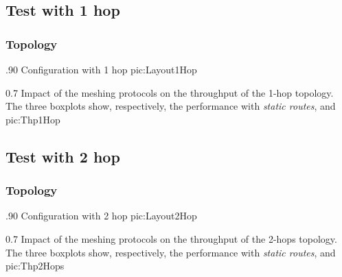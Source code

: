 \subsection{Test with 1 hop}

    \subsubsection{Topology}

                {.90\columnwidth}
                {Configuration with 1 hop}
                {pic:Layout1Hop}

                {0.7 \columnwidth}
                {Impact of the meshing protocols on the throughput of the
                 1-hop topology. The three boxplots show, respectively, the
                 performance with \emph{static routes}, \emph{\batman} and
                 \emph{\olsr}}
                {pic:Thp1Hop}

\subsection{Test with 2 hop}

    \subsubsection{Topology}

                {.90\columnwidth}
                {Configuration with 2 hop}
                {pic:Layout2Hop}

                {0.7 \columnwidth}
                {Impact of the meshing protocols on the throughput of the
                 2-hops topology. The three boxplots show, respectively,
                 the performance with \emph{static routes}, \emph{\batman}
                 and \emph{\olsr}}
                {pic:Thp2Hops}
